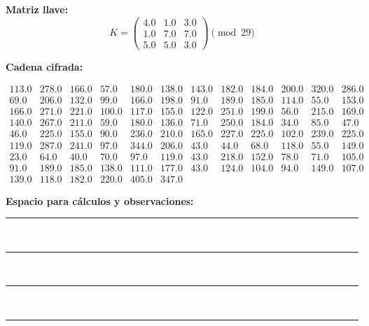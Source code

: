 \documentclass{article}%
\begin{document}
\textbf{Matriz llave:}
\[
K = \begin{pmatrix}
4.0 & 1.0 & 3.0 \\
1.0 & 7.0 & 7.0 \\
5.0 & 5.0 & 3.0
\end{pmatrix} \pmod{29}
\]

\textbf{Cadena cifrada:}
\begin{center}
$\begin{array}{lllllllllllllll}
113.0 & 278.0 & 166.0 & 57.0 & 180.0 & 138.0 & 143.0 & 182.0 & 184.0 & 200.0 & 320.0 & 286.0 \\
69.0 & 206.0 & 132.0 & 99.0 & 166.0 & 198.0 & 91.0 & 189.0 & 185.0 & 114.0 & 55.0 & 153.0 \\
166.0 & 271.0 & 221.0 & 100.0 & 117.0 & 155.0 & 122.0 & 251.0 & 199.0 & 56.0 & 215.0 & 169.0 \\
140.0 & 267.0 & 211.0 & 59.0 & 180.0 & 136.0 & 71.0 & 250.0 & 184.0 & 34.0 & 85.0 & 47.0 \\
46.0 & 225.0 & 155.0 & 90.0 & 236.0 & 210.0 & 165.0 & 227.0 & 225.0 & 102.0 & 239.0 & 225.0 \\
119.0 & 287.0 & 241.0 & 97.0 & 344.0 & 206.0 & 43.0 & 44.0 & 68.0 & 118.0 & 55.0 & 149.0 \\
23.0 & 64.0 & 40.0 & 70.0 & 97.0 & 119.0 & 43.0 & 218.0 & 152.0 & 78.0 & 71.0 & 105.0 \\
91.0 & 189.0 & 185.0 & 138.0 & 111.0 & 177.0 & 43.0 & 124.0 & 104.0 & 94.0 & 149.0 & 107.0 \\
139.0 & 118.0 & 182.0 & 220.0 & 405.0 & 347.0
\end{array}$
\end{center}

\bigskip
\textbf{Espacio para cálculos y observaciones:}\\[6pt]
\rule{\linewidth}{0.4pt}\\[10pt]
\rule{\linewidth}{0.4pt}\\[10pt]
\rule{\linewidth}{0.4pt}\\[10pt]
\rule{\linewidth}{0.4pt}\\[10pt]
%
\end{document}
